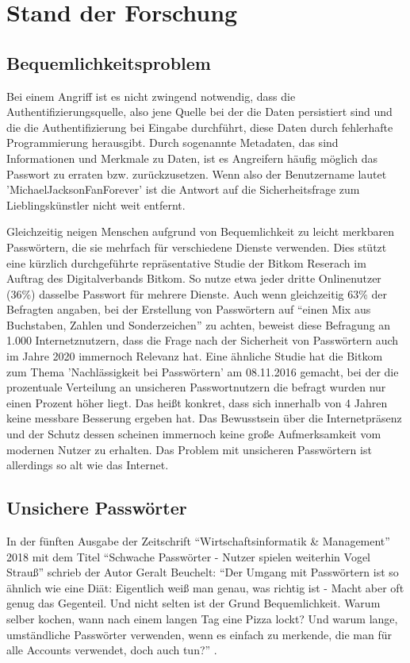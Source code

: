 \section{Stand der Forschung}
\subsection{Bequemlichkeitsproblem}
Bei einem Angriff ist es nicht zwingend notwendig, dass die Authentifizierungsquelle, also jene Quelle bei der die Daten persistiert sind und die die Authentifizierung bei Eingabe durchführt, diese Daten durch fehlerhafte Programmierung herausgibt. Durch sogenannte Metadaten, das sind Informationen und Merkmale zu Daten, ist es Angreifern häufig möglich das Passwort zu erraten bzw. zurückzusetzen. Wenn also der Benutzername lautet 'MichaelJacksonFanForever' ist die Antwort auf die Sicherheitsfrage zum Lieblingskünstler nicht weit entfernt.

Gleichzeitig neigen Menschen aufgrund von Bequemlichkeit zu leicht merkbaren Passwörtern, die sie mehrfach für verschiedene Dienste verwenden. Dies stützt eine kürzlich durchgeführte repräsentative Studie der Bitkom Reserach \cite{A1} im Auftrag des Digitalverbands Bitkom. So nutze etwa jeder dritte Onlinenutzer (36\%) dasselbe Passwort für mehrere Dienste. Auch wenn gleichzeitig 63\% der Befragten angaben, bei der Erstellung von Passwörtern auf ``einen Mix aus Buchstaben, Zahlen und Sonderzeichen'' zu achten, beweist diese Befragung an 1.000 Internetznutzern, dass die Frage nach der Sicherheit von Passwörtern auch im Jahre 2020 immernoch Relevanz hat. Eine ähnliche Studie hat die Bitkom zum Thema 'Nachlässigkeit bei Passwörtern' am 08.11.2016 \cite{A2} gemacht, bei der die prozentuale Verteilung an unsicheren Passwortnutzern die befragt wurden nur einen Prozent höher liegt. Das heißt konkret, dass sich innerhalb von 4 Jahren keine messbare Besserung ergeben hat. Das Bewusstsein über die Internetpräsenz und der Schutz dessen scheinen immernoch keine große Aufmerksamkeit vom modernen Nutzer zu erhalten. Das Problem mit unsicheren Passwörtern ist allerdings so alt wie das Internet.

\subsection{Unsichere Passwörter}
In der fünften Ausgabe der Zeitschrift ``Wirtschaftsinformatik \& Management''  2018 mit dem Titel ``Schwache Passwörter - Nutzer spielen weiterhin Vogel Strauß'' schrieb der Autor Geralt Beuchelt: ``Der Umgang mit Passwörtern ist so ähnlich wie eine Diät: Eigentlich weiß man genau, was richtig ist - Macht aber oft genug das Gegenteil. Und nicht selten ist der Grund Bequemlichkeit. Warum selber kochen, wann nach einem langen Tag eine Pizza lockt? Und warum lange, umständliche Passwörter verwenden, wenn es einfach zu merkende, die man für alle Accounts verwendet, doch auch tun?'' \cite{A3}.
\newpage

